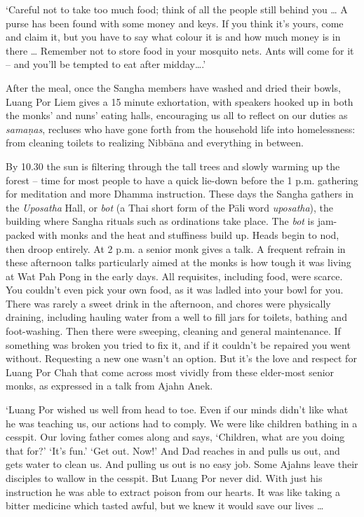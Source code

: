 `Careful not to take too much food; think of all the people still behind
you \ldots{} A purse has been found with some money and keys. If you
think it's yours, come and claim it, but you have to say what colour it
is and how much money is in there \ldots{} Remember not to store food
in your mosquito nets. Ants will come for it -- and you'll be tempted to
eat after midday\ldots{}.'

After the meal, once the Sangha members have washed and dried their
bowls, Luang Por Liem gives a 15 minute exhortation, with speakers
hooked up in both the monks' and nuns' eating halls, encouraging us all
to reflect on our duties as \emph{samaṇas}, recluses who have gone forth
from the household life into homelessness: from cleaning toilets to
realizing Nibbāna and everything in between. 

By 10.30 the sun is filtering through the tall trees and slowly warming
up the forest -- time for most people to have a quick lie-down before
the 1 p.m. gathering for meditation and more Dhamma instruction. These
days the Sangha gathers in the \emph{Uposatha} Hall, or \emph{bot} (a
Thai short form of the Pāli word \emph{uposatha}), the building where
Sangha rituals such as ordinations take place. The \emph{bot} is
jam-packed with monks and the heat and stuffiness build up. Heads begin
to nod, then droop entirely. At 2 p.m. a senior monk gives a talk. A
frequent refrain in these afternoon talks particularly aimed at the
monks is how tough it was living at Wat Pah Pong in the early days. All
requisites, including food, were scarce. You couldn't even pick your own
food, as it was ladled into your bowl for you. There was rarely a sweet
drink in the afternoon, and chores were physically draining, including
hauling water from a well to fill jars for toilets, bathing and
foot-washing. Then there were sweeping, cleaning and general
maintenance. If something was broken you tried to fix it, and if it
couldn't be repaired you went without. Requesting a new one wasn't an
option. But it's the love and respect for Luang Por Chah that come
across most vividly from these elder-most senior monks, as expressed in
a talk from Ajahn Anek.

`Luang Por wished us well from head to toe. Even if our minds didn't
like what he was teaching us, our actions had to comply. We were like
children bathing in a cesspit. Our loving father comes along and says,
`Children, what are you doing that for?' `It's fun.' `Get out. Now!' And
Dad reaches in and pulls us out, and gets water to clean us. And pulling
us out is no easy job. Some Ajahns leave their disciples to wallow in
the cesspit. But Luang Por never did. With just his instruction he was
able to extract poison from our hearts. It was like taking a bitter
medicine which tasted awful, but we knew it would save our lives
\ldots{}


